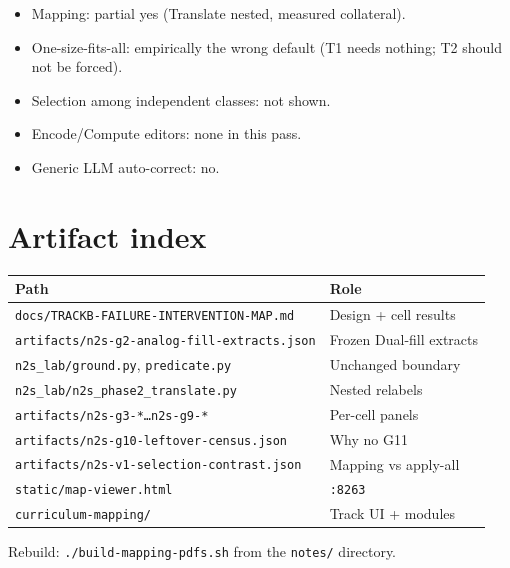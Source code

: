 \documentclass[11pt,a4paper]{article}
\begin{document}
\begin{itemize}
  \item Mapping: partial yes (Translate nested, measured collateral).
  \item One-size-fits-all: empirically the wrong default (T1 needs nothing; T2 should not be forced).
  \item Selection among independent classes: not shown.
  \item Encode/Compute editors: none in this pass.
  \item Generic LLM auto-correct: no.
\end{itemize}

\section{Artifact index}

\begin{center}
\begin{tabular}{@{}ll@{}}
\toprule
Path & Role \\
\midrule
\texttt{docs/TRACKB-FAILURE-INTERVENTION-MAP.md} & Design + cell results \\
\texttt{artifacts/n2s-g2-analog-fill-extracts.json} & Frozen Dual-fill extracts \\
\texttt{n2s\_lab/ground.py}, \texttt{predicate.py} & Unchanged boundary \\
\texttt{n2s\_lab/n2s\_phase2\_translate.py} & Nested relabels \\
\texttt{artifacts/n2s-g3-*\ldots n2s-g9-*} & Per-cell panels \\
\texttt{artifacts/n2s-g10-leftover-census.json} & Why no G11 \\
\texttt{artifacts/n2s-v1-selection-contrast.json} & Mapping vs apply-all \\
\texttt{static/map-viewer.html} & \texttt{:8263} \\
\texttt{curriculum-mapping/} & Track UI + modules \\
\bottomrule
\end{tabular}
\end{center}

\vspace{1em}
\begin{center}
\color{muted}\small
Rebuild: \texttt{./build-mapping-pdfs.sh} from the \texttt{notes/} directory.
\end{center}
\end{document}
